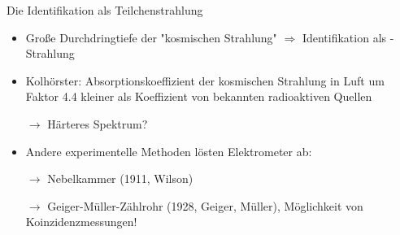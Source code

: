 \documentclass[aspectratio=1610, professionalfonts, 9pt, hyperref={colorlinks=false}]{beamer}
\begin{document}
%  

\begin{frame}{Die Identifikation als Teilchenstrahlung}
      \begin{itemize}
        \setlength\itemsep{0.5em}
        \item Große Durchdringtiefe der "kosmischen Strahlung" $\Rightarrow$ Identifikation als \gamma-Strahlung
        \item Kolhörster: Absorptionskoeffizient der kosmischen Strahlung in Luft um Faktor \num{4.4} kleiner als Koeffizient von bekannten radioaktiven Quellen  
        \item [$\rightarrow$] Härteres Spektrum?
        \item Andere experimentelle Methoden lösten Elektrometer ab:
        \item [$\rightarrow$] Nebelkammer (1911, Wilson)
        \item [$\rightarrow$] Geiger-Müller-Zählrohr (1928, Geiger, Müller), Möglichkeit von Koinzidenzmessungen!
      \end{itemize}
\end{frame}
\end{document}

